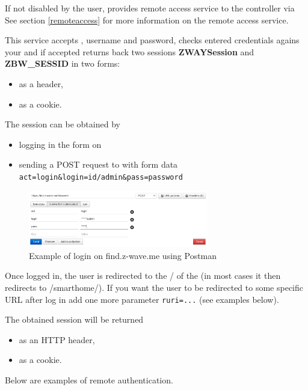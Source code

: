 If not disabled by the user, \zway provides remote access service to the controller via 
See section \ref{remoteaccess} for more information on the \zway remote access service.

This service accepts \zwaydeviceid, username and password, checks entered
credentials agains your \zway and if accepted returns back two sessions \textbf{ZWAYSession}
and \textbf{ZBW\_SESSID} in two forms:
\begin{itemize}
\item as a header,
\item as a cookie.
\end{itemize}

The session can be obtained by
\begin{itemize}
\item logging in the form on 
\item sending a POST request to  with form data \texttt{act=login\&login=id/admin\&pass=password}
\end{itemize}

\begin{figure}
\begin{center}
\includegraphics[width=0.7\textwidth]{pngs/cap13/find-login-postman.png}
\caption{Example of login on find.z-wave.me using Postman}
\label{authenticatioln_remote_find}
\end{center}
\end{figure}

Once logged in, the user is redirected to the / of the \zway (in most cases it then redirects to /smarthome/).
If you want the user to be redirected to some specific URL after log in add one more parameter \texttt{ruri=...} (see examples below).

The obtained session will be returned
\begin{itemize}
\item as an HTTP header,
\item as a cookie.
\end{itemize}

Below are examples of remote authentication.

